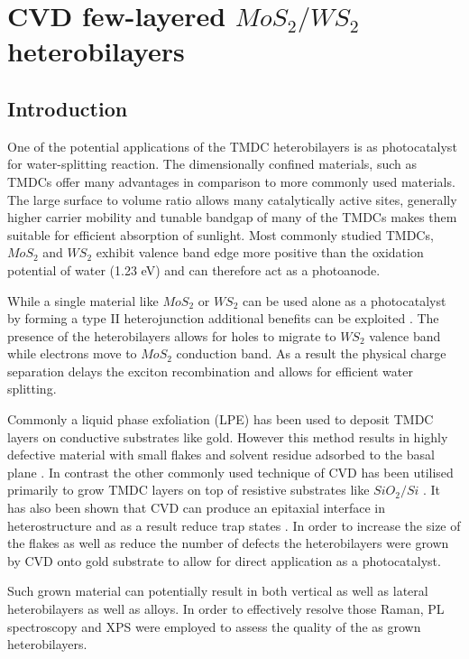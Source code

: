 \chapter{CVD few-layered $MoS_2/WS_2$ heterobilayers}
\label{cha:Heterostructures}

\section{Introduction}

One of the potential applications of the TMDC heterobilayers is as photocatalyst for water-splitting reaction. The dimensionally confined materials, such as TMDCs offer many advantages in comparison to more commonly used materials. The large surface to volume ratio allows many catalytically active sites, generally higher carrier mobility and tunable bandgap of many of the TMDCs makes them suitable for efficient absorption of sunlight. Most commonly studied TMDCs, $MoS_2$ and $WS_2$ exhibit valence band edge more positive than the oxidation potential of water (1.23 eV) and can therefore act as a photoanode. 

While a single material like $MoS_2$ or $WS_2$ can be used alone as a photocatalyst by forming a type II heterojunction additional benefits can be exploited \cite{Chen2016}\cite{Wang2013}. The presence of the heterobilayers allows for holes to migrate to $WS_2$ valence band while electrons move to $MoS_2$ conduction band. As a result the physical charge separation delays the exciton recombination and allows for efficient water splitting. 

Commonly a liquid phase exfoliation (LPE) has been used to deposit TMDC layers on conductive substrates like gold. However this method results in highly defective material with small flakes and solvent residue adsorbed to the basal plane \cite{Yu2017}\cite{Yu2016}\cite{Sivula2016}. In contrast the other commonly used technique of CVD has been utilised primarily to grow TMDC layers on top of resistive substrates like $SiO_2/Si$ \cite{Reale2017}. It has also been shown that CVD can produce an epitaxial interface in heterostructure and as a result reduce trap states \cite{Tan2018}. In order to increase the size of the flakes as well as reduce the number of defects the heterobilayers were grown by CVD onto gold substrate to allow for direct application as a photocatalyst.

Such grown material can potentially result in both vertical as well as lateral heterobilayers as well as alloys. In order to effectively resolve those Raman, PL spectroscopy and XPS were employed to assess the quality of the as grown heterobilayers.


